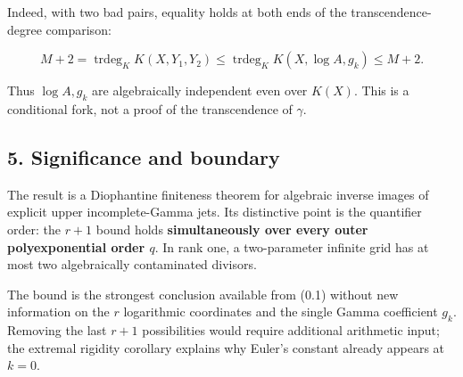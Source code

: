 Indeed, with two bad pairs, equality holds at both ends of the
transcendence-degree comparison:

\[
 M+2
 =\operatorname{trdeg}_K K(X,Y_1,Y_2)
 \leq\operatorname{trdeg}_K K(X,\log A,g_k)
 \leq M+2.
\]

Thus \(\log A,g_k\) are algebraically independent even over \(K(X)\).
This is a conditional fork, not a proof of the transcendence of
\(\gamma\).

\subsection{5. Significance and boundary}

The result is a Diophantine finiteness theorem for algebraic inverse images
of explicit upper incomplete-Gamma jets. Its distinctive point is the
quantifier order: the \(r+1\) bound holds \textbf{simultaneously over every outer
polyexponential order \(q\)}. In rank one, a two-parameter infinite grid
has at most two algebraically contaminated divisors.

The bound is the strongest conclusion available from (0.1) without new
information on the \(r\) logarithmic coordinates and the single Gamma
coefficient \(g_k\). Removing the last \(r+1\) possibilities would require
additional arithmetic input; the extremal rigidity corollary explains
why Euler's constant already appears at \(k=0\).
